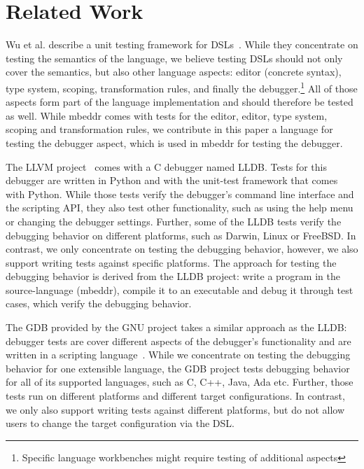 \section{Related Work}

Wu et al. describe a unit testing framework for
\acp{DSL}~\cite{DBLP:conf/dsl/WuGM09}. 
While they concentrate on testing the semantics of the language, we believe testing
\acp{DSL} should not only cover the semantics, but also other language
aspects: editor (concrete syntax), type system, scoping, transformation rules,
and finally the debugger.\footnote{Specific language workbenches might require
testing of additional aspects} All of those aspects
form part of the language implementation and should therefore be tested as well.
While mbeddr comes with tests for the editor, editor, type system, scoping and
transformation rules, we contribute in this paper a language for testing the
debugger aspect, which is used in mbeddr for testing the debugger.

The \ac{LLVM} project~\cite{LLDB} comes with a C debugger named \ac{LLDB}.
Tests for this debugger are written in Python and with the 
unit-test framework that comes with Python.
While those tests verify the debugger's command
line interface and the scripting API, they also test other functionality, such
as using the help menu or changing the debugger settings.
Further, some of the \ac{LLDB} tests  
verify the debugging behavior on different platforms, such as Darwin, Linux or
FreeBSD. In contrast, we only concentrate on testing the debugging behavior,
however, we also support writing tests against specific platforms. 
The approach for testing the debugging behavior is derived from the \ac{LLDB}
project:
write a program in the source-language (mbeddr), compile it to an executable and
debug it through test cases, which verify the debugging behavior.

The \ac{GDB} provided by the GNU project takes a similar
approach as the \ac{LLDB}: debugger tests are cover different aspects of the
debugger's functionality and are written in a scripting language~\cite{gdb}.
While we concentrate on testing the debugging behavior for one extensible
language, the \ac{GDB} project tests debugging behavior for all of its supported
languages, such as C, C++, Java, Ada etc. Further, those tests run on different
platforms and different target configurations. In contrast, we only also support
writing tests against different platforms, but do not allow users to change the
target configuration via the \ac{DSL}.
